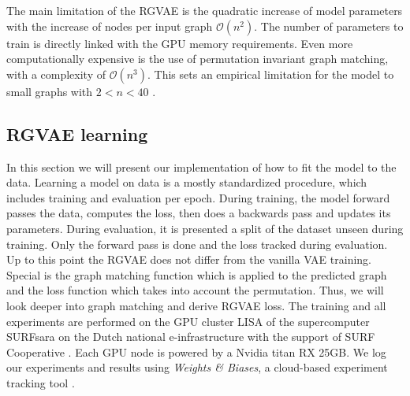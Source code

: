 The main limitation of the RGVAE is the quadratic increase of model parameters with the increase of nodes per input graph $\mathcal{O}(n^2)$. The number of parameters to train is directly linked with the GPU memory requirements. Even more computationally expensive is the use of permutation invariant graph matching, with a complexity of $\mathcal{O}(n^3)$. This sets an empirical limitation for the model to small graphs with $2<n<40$ \cite{simonovsky_graphvae_2018}.






\subsection{RGVAE learning}

In this section we will present our implementation of how to fit the model to the data. Learning a model on data is a mostly standardized procedure, which includes training and evaluation per epoch. During training, the model forward passes the data, computes the loss, then does a backwards pass and updates its parameters. During evaluation, it is presented a split of the dataset unseen during training. Only the forward pass is done and the loss tracked during evaluation. Up to this point the RGVAE does not differ from the vanilla VAE training. Special is the graph matching function which is applied to the predicted graph and the loss function which takes into account the permutation. Thus, we will look deeper into graph matching and derive RGVAE loss.
The training and all experiments are performed on the GPU cluster LISA of the supercomputer SURFsara on the Dutch national e-infrastructure with the support of SURF Cooperative \cite{fengvaleriu}. Each GPU node is powered by a Nvidia titan RX 25GB. We log our experiments and results using \textit{Weights & Biases}, a cloud-based experiment tracking tool \cite{wandb}.



